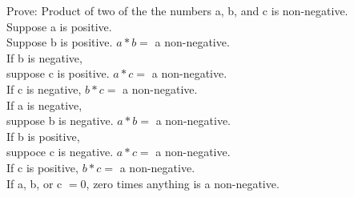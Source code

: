 \documentclass{article}
\begin{document}
\begin{itemize}
\begin{itemize}
      Prove: Product of two of the the numbers a, b, and c is non-negative.\\
      Suppose a is positive.\\
        Suppose b is positive. $a*b=$ a non-negative.\\
        If b is negative,\\
          suppose c is positive. $a*c=$ a non-negative.\\
          If c is negative, $b*c=$ a non-negative.\\
      If a is negative,\\
        suppose b is negative. $a*b=$ a non-negative.\\
        If b is positive,\\
          suppoce c is negative. $a*c=$ a non-negative.\\
          If c is positive, $b*c=$ a non-negative.\\
      If a, b, or c $=0$, zero times anything is a non-negative.\\


\end{itemize}
\end{itemize}
\end{document}
